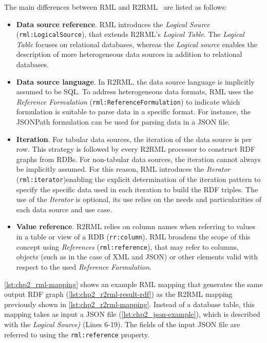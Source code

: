 The main differences between RML and R2RML~\parencite{dimou2020rml-r2rml-diffs} are listed as follows:
\begin{itemize}
    \item \textbf{Data source reference}. RML introduces the \textit{Logical Source} (\texttt{rml:LogicalSource}), that extends R2RML's \textit{Logical Table}. The \textit{Logical Table} focuses on relational databases, whereas the \textit{Logical source} enables the description of more heterogeneous data sources in addition to relational databases.

    \item \textbf{Data source language}. In R2RML, the data source language is implicitly assumed to be SQL. To address heterogeneous data formats, RML uses the \textit{Reference Formulation} (\texttt{rml:ReferenceFormulation}) to indicate which formulation is suitable to parse data in a specific format. For instance, the JSONPath formulation can be used for parsing data in a JSON file. 

    \item \textbf{Iteration}. For tabular data sources, the iteration of the data source is per row. This strategy is followed by every R2RML processor to construct RDF graphs from RDBs. For non-tabular data sources, the iteration cannot always be implicitly assumed. For this reason, RML introduces the \textit{Iterator} (\texttt{rml:iterator})enabling the explicit determination of the iteration pattern to specify the specific data used in each iteration to build the RDF triples. The use of the \textit{Iterator} is optional, its use relies on the needs and particularities of each data source and use case.

    \item \textbf{Value reference}. R2RML relies on column names when referring to values in a table or view of a RDB (\texttt{rr:column}). RML broadens the scope of this concept using \textit{References} (\texttt{rml:reference}), that may refer to columns, objects (such as in the case of XML and JSON) or other elements valid with respect to the used \textit{Reference Formulation}. 
\end{itemize}


\cref{lst:chp2_rml-mapping} shows an example RML mapping that generates the same output RDF graph (\cref{lst:chp2_r2rml-result-rdf}) as the R2RML mapping previously shown in \cref{lst:chp2_r2rml-mapping}. Instead of a database table, this mapping takes as input a JSON file (\cref{lst:chp2_json-example}), which is described with the \textit{Logical Source)} (Lines 6-19). The fields of the input JSON file are referred to using the \texttt{rml:reference} property. 


